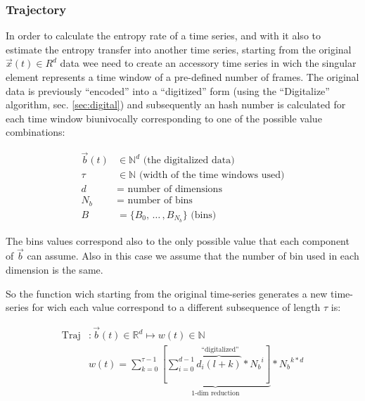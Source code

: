 \documentclass[a4paper]{article}
\begin{document}
\subsubsection{Trajectory}\label{sec:traj}
In order to calculate the entropy rate of a time series, and with it also to estimate the entropy transfer into another time series, starting from the original $\vec{x}(t) \in R^d$ data wee need to create an accessory time series in wich the singular element represents a time window of a pre-defined number of frames. The original data is previously ``encoded'' into a ``digitized'' form (using the ``Digitalize'' algorithm, sec. \ref{sec:digital}) and subsequently an hash number is calculated for each time window biunivocally corresponding to one of the possible value combinations:

\begin{align*}
 \vec{b}(t) &\in \mathbb{N}^d \text{ (the digitalized data)}\\
 \tau       &\in \mathbb{N} \text{ (width of the time windows used)}\\
 d          &=   \text{ number of dimensions}\\
 {N_b}      &=   \text{ number of bins} \\
 {B}        &=   \{ B_0,\,\dots\, ,B_{{N_b}} \}\text{ (bins)}
\end{align*}

The bins values correspond also to the only possible value that each component of $\vec{b}$ can assume. Also in this case we assume that the number of bin used in each dimension is the same.

So the function wich starting from the original time-series generates a new time-series for wich each value correspond to a different subsequence of length $\tau$ is:

\begin{align*}
 \text{Traj} &: \vec{b}(t) \in \mathbb{R}^d \longmapsto w(t) \in \mathbb{N} \\
 { }         & w(t) = \sum_{k=0}^{\tau-1} \underbrace{\left [ \sum_{i=0}^{d-1} \overbrace{d_i(l+k)}^{\text{ ``digitalized''}} * {N_b}^i \right ]}_{\text{1-dim reduction}} * {N_b}^{k*d}
\end{align*}
\end{document}
